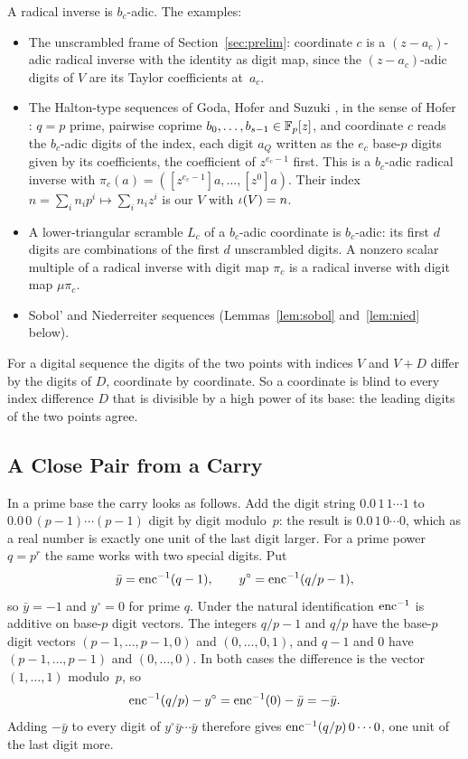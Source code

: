 A radical inverse is $b_c$-adic. The examples:
\begin{itemize}
\item The unscrambled frame of Section~\ref{sec:prelim}: coordinate $c$ is a $(z-a_c)$-adic radical inverse with the identity as digit map, since the $(z-a_c)$-adic digits of $V$ are its Taylor coefficients at~$a_c$.
\item The Halton-type sequences of Goda, Hofer and Suzuki \cite[Def.~2]{GHS26}, in the sense of Hofer \cite{Hof13}: $q=p$ prime, pairwise coprime $b_0,\dots,b_{s-1}\in\mathbb{F}_p[z]$, and coordinate $c$ reads the $b_c$-adic digits of the index, each digit $a_Q$ written as the $e_c$ base-$p$ digits given by its coefficients, the coefficient of $z^{e_c-1}$ first. This is a $b_c$-adic radical inverse with $\pi_c(a)=([z^{e_c-1}]a,\dots,[z^0]a)$. Their index $n=\sum_in_ip^i\mapsto\sum_in_iz^i$ is our $V$ with $\iota(V)=n$.
\item A lower-triangular scramble $L_c$ of a $b_c$-adic coordinate is $b_c$-adic: its first $d$ digits are combinations of the first $d$ unscrambled digits. A nonzero scalar multiple of a radical inverse with digit map $\pi_c$ is a radical inverse with digit map $\mu\pi_c$.
\item Sobol' and Niederreiter sequences (Lemmas~\ref{lem:sobol} and~\ref{lem:nied} below).
\end{itemize}
For a digital sequence the digits of the two points with indices $V$ and $V+D$ differ by the digits of $D$, coordinate by coordinate. So a coordinate is blind to every index difference $D$ that is divisible by a high power of its base: the leading digits of the two points agree.

\subsection{A Close Pair from a Carry}
In a prime base the carry looks as follows. Add the digit string $0.0\,1\,1\cdots1$ to $0.0\,0\,(p-1)\cdots(p-1)$ digit by digit modulo~$p$: the result is $0.0\,1\,0\cdots0$, which as a real number is exactly one unit of the last digit larger. For a prime power $q=p^r$ the same works with two special digits. Put
\[
\bar y=\operatorname{enc}^{-1}(q-1),\qquad y^\circ=\operatorname{enc}^{-1}(q/p-1),
\]
so $\bar y=-1$ and $y^\circ=0$ for prime $q$. Under the natural identification $\operatorname{enc}^{-1}$ is additive on base-$p$ digit vectors. The integers $q/p-1$ and $q/p$ have the base-$p$ digit vectors $(p-1,\dots,p-1,0)$ and $(0,\dots,0,1)$, and $q-1$ and $0$ have $(p-1,\dots,p-1)$ and $(0,\dots,0)$. In both cases the difference is the vector $(1,\dots,1)$ modulo~$p$, so
\begin{equation}\label{eq:carrydigit}
\operatorname{enc}^{-1}(q/p)-y^\circ=\operatorname{enc}^{-1}(0)-\bar y=-\bar y.
\end{equation}
Adding $-\bar y$ to every digit of $y^\circ\bar y\cdots\bar y$ therefore gives $\operatorname{enc}^{-1}(q/p)\,0\cdots0$, one unit of the last digit more.


